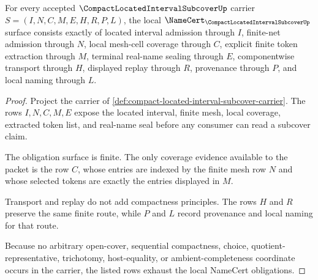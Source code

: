 \begin{theorem}
\label{thm:compact-located-interval-subcover-obligations}
For every accepted $\CompactLocatedIntervalSubcoverUp$ carrier $S=(I,N,C,M,E,H,R,P,L)$, the local $\NameCert_{\CompactLocatedIntervalSubcoverUp}$ surface consists exactly of located interval admission through $I$, finite-net admission through $N$, local mesh-cell coverage through $C$, explicit finite token extraction through $M$, terminal real-name sealing through $E$, componentwise transport through $H$, displayed replay through $R$, provenance through $P$, and local naming through $L$.
\end{theorem}
\begin{proof}
Project the carrier of \autoref{def:compact-located-interval-subcover-carrier}. The rows $I,N,C,M,E$ expose the located interval, finite mesh, local coverage, extracted token list, and real-name seal before any consumer can read a subcover claim.

The obligation surface is finite. The only coverage evidence available to the packet is the row $C$, whose entries are indexed by the finite mesh row $N$ and whose selected tokens are exactly the entries displayed in $M$.

Transport and replay do not add compactness principles. The rows $H$ and $R$ preserve the same finite route, while $P$ and $L$ record provenance and local naming for that route.

Because no arbitrary open-cover, sequential compactness, choice, quotient-representative, trichotomy, host-equality, or ambient-completeness coordinate occurs in the carrier, the listed rows exhaust the local NameCert obligations.
\end{proof}

